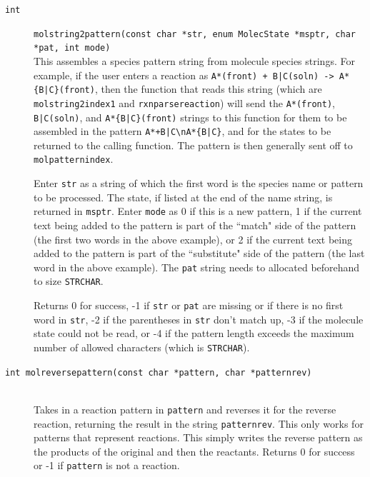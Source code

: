 \documentclass {scrbook}
\newcommand {\ttt} {\texttt}
\begin{document}
\begin{description}
\item[\ttt{int}]
\ttt{molstring2pattern(const char *str, enum MolecState *msptr, char *pat, int mode)}
\hfill \\
This assembles a species pattern string from molecule species strings. For example, if the user enters a reaction as \ttt{A*(front) + B|C(soln) -> A*\{B|C\}(front)}, then the function that reads this string (which are \ttt{molstring2index1} and \ttt{rxnparsereaction}) will send the \ttt{A*(front)}, \ttt{B|C(soln)}, and \ttt{A*\{B|C\}(front)} strings to this function for them to be assembled in the pattern \ttt{A*+B|C\textbackslash nA*\{B|C\}}, and for the states to be returned to the calling function. The pattern is then generally sent off to \ttt{molpatternindex}.

Enter \ttt{str} as a string of which the first word is the species name or pattern to be processed. The state, if listed at the end of the name string, is returned in \ttt{msptr}. Enter \ttt{mode} as 0 if this is a new pattern, 1 if the current text being added to the pattern is part of the ``match" side of the pattern (the first two words in the above example), or 2 if the current text being added to the pattern is part of the ``substitute" side of the pattern (the last word in the above example). The \ttt{pat} string needs to allocated beforehand to size \ttt{STRCHAR}.

Returns 0 for success, -1 if \ttt{str} or \ttt{pat} are missing or if there is no first word in \ttt{str}, -2 if the parentheses in \ttt{str} don't match up, -3 if the molecule state could not be read, or -4 if the pattern length exceeds the maximum number of allowed characters (which is \ttt{STRCHAR}).

\item[\ttt{int molreversepattern(const char *pattern, char *patternrev)}]
\hfill \\
Takes in a reaction pattern in \ttt{pattern} and reverses it for the reverse reaction, returning the result in the string \ttt{patternrev}. This only works for patterns that represent reactions. This simply writes the reverse pattern as the products of the original and then the reactants. Returns 0 for success or -1 if \ttt{pattern} is not a reaction.


\end{description}
\end{document}
